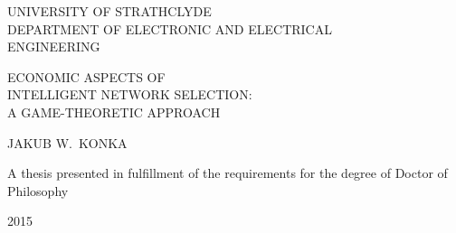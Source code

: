 \begin{titlepage}

{\centering

{\sffamily\Large UNIVERSITY OF STRATHCLYDE}\\
{\sffamily\Large DEPARTMENT OF ELECTRONIC AND ELECTRICAL}\\
{\sffamily\Large ENGINEERING}

\vspace*{3cm}

{\sffamily\Huge ECONOMIC ASPECTS OF}\\[0.5em]
{\sffamily\Huge INTELLIGENT NETWORK SELECTION:}\\[0.5em]
{\sffamily\Huge A GAME-THEORETIC APPROACH}

\vspace{8cm}

{\sffamily\LARGE JAKUB W.~KONKA}

\par
\vspace{3cm}

{\sffamily\Large A thesis presented in fulfillment of the requirements for the degree of Doctor of Philosophy}

\par
\vspace{1cm}

{\sffamily\Large 2015}

}

\end{titlepage}